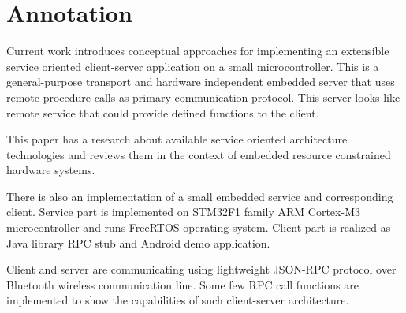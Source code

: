 \clearpage\vspace*{\fill}
\section*{Annotation}
Current work introduces conceptual approaches for implementing an extensible
service oriented client-server application on a small microcontroller.
This is a general-purpose transport and hardware independent embedded server
that uses remote procedure calls as primary communication protocol.
This server looks like remote service that could provide defined functions to
the client.

This paper has a research about available service oriented architecture technologies and reviews them in the context of embedded resource constrained hardware systems.

There is also an implementation of a small embedded service and corresponding client.
Service part is implemented on STM32F1 family ARM Cortex-M3 microcontroller and runs FreeRTOS operating system.
Client part is realized as Java library RPC stub and Android demo application.

Client and server are communicating using lightweight JSON-RPC protocol over Bluetooth wireless communication line.
Some few RPC call functions are implemented to show the capabilities of such client-server architecture.

\vspace{\fill}
\clearpage